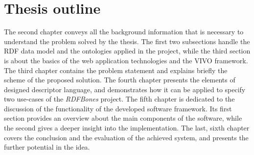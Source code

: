 \section{Thesis outline}

The second chapter conveys all the background information that is necessary to understand the problem solved by the thesis. The first two subsections handle the RDF data model and the ontologies applied in the project, while the third section is about the basics of the web application technologies and the VIVO framework. The third chapter contains the problem statement and explains briefly the scheme of the proposed solution. The fourth chapter presents the elements of designed descriptor language, and demonstrates how it can be applied to specify two use-cases of the \textit{RDFBones} project. The fifth chapter is dedicated to the discussion of the functionality of the developed software framework. Its first section provides an overview about the main components of the software, while the second gives a deeper insight into the implementation. The last, sixth chapter covers the conclusion and the evaluation of the achieved system, and presents the further potential in the idea.
